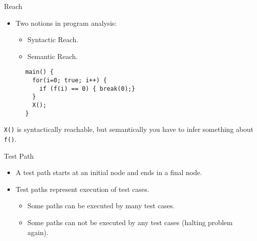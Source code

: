 \documentclass[handout]{beamer}
\begin{document}
\begin{frame}[fragile]{Reach}
  \begin{itemize}
  \item Two notions in program analysis:
    \begin{itemize}
    \item Syntactic Reach. 
    \item Semantic Reach.
    \end{itemize}
   \end{itemize}
\begin{lstlisting}
      main() {
        for(i=0; true; i++) {
          if (f(i) == 0) { break(0);}
        }
        X();
      }
\end{lstlisting}
{\tt X()}  is syntactically reachable, but
semantically you have to infer something about {\tt f()}.
\end{frame}
\begin{frame}{Test Path}
   \begin{itemize}
   \item  A test path starts at an initial node and ends in a final
     node.
   \item Test paths represent execution of test cases.
     \begin{itemize}
     \item  Some paths can be executed by many test cases.
     \item Some paths can not be executed by any test cases (halting
       problem again).
     \end{itemize}
   \end{itemize}
\end{frame}
\end{document}

